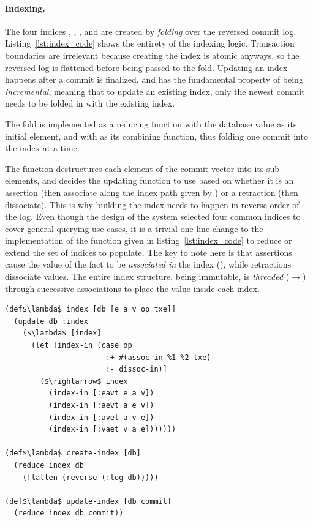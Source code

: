 \paragraph{Indexing.} The four indices , , , and  are created by \emph{folding} over the reversed commit log. Listing~\ref{lst:index_code} shows the entirety of the indexing logic. Transaction boundaries are irrelevant because creating the index is atomic anyways, so the reversed log is flattened before being passed to the fold. Updating an index happens after a commit is finalized, and has the fundamental property of being \emph{incremental}, meaning that to update an existing index, only the newest commit needs to be folded in with the existing index.

The fold is implemented as a reducing function with the database value as its initial element, and with  as its combining function, thus folding one commit into the index at a time.

The  function destructures each element of the commit vector into its sub-elements, and decides the updating function to use based on whether it is an assertion (then associate  along the index path given by ) or a retraction (then dissociate). This is why building the index needs to happen in reverse order of the log. Even though the design of the system selected four common indices to cover general querying use cases, it is a trivial one-line change to the implementation of the  function given in listing~\ref{lst:index_code} to reduce or extend the set of indices to populate. The key to note here is that assertions cause the value of the fact to be \emph{associated in} the index (), while retractions dissociate values. The entire index structure, being immutable, is \emph{threaded} ($\rightarrow$) through successive associations to place the value inside each index.

\begin{lstlisting}[label={lst:index_code},morekeywords={:eavt,:avet,:aevt,:vaet,flatten,def,assoc-in,dissoc-in},caption=Updating the index]
(def$\lambda$ index [db [e a v op txe]]
  (update db :index
    ($\lambda$ [index]
      (let [index-in (case op
                       :+ #(assoc-in %1 %2 txe)
                       :- dissoc-in)]
        ($\rightarrow$ index
          (index-in [:eavt e a v])
          (index-in [:aevt a e v])
          (index-in [:avet a v e])
          (index-in [:vaet v a e]))))))

(def$\lambda$ create-index [db]
  (reduce index db
    (flatten (reverse (:log db)))))

(def$\lambda$ update-index [db commit]
  (reduce index db commit))
\end{lstlisting}

